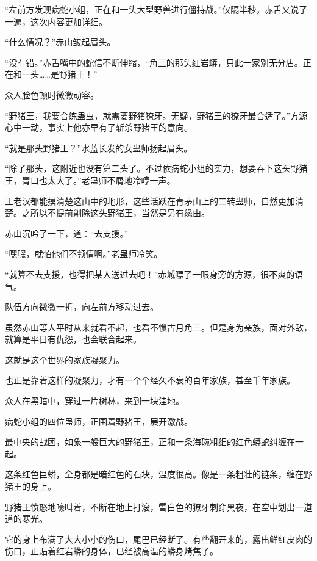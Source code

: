 
\begin{this_body}



“左前方发现病蛇小组，正在和一头大型野兽进行僵持战。”仅隔半秒，赤舌又说了一遍，这次内容更加详细。

“什么情况？”赤山皱起眉头。

“没有错。”赤舌嘴中的蛇信不断伸缩，“角三的那头红岩蟒，只此一家别无分店。正在和一头……是野猪王！”

众人脸色顿时微微动容。

“野猪王，我要合练蛊虫，就需要野猪獠牙。无疑，野猪王的獠牙最合适了。”方源心中一动，事实上他亦早有了斩杀野猪王的意向。

“就是那头野猪王？”水蓝长发的女蛊师扬起眉头。

“除了那头，这附近也没有第二头了。不过依病蛇小组的实力，想要吞下这头野猪王，胃口也太大了。”老蛊师不屑地冷哼一声。

王老汉都能摸清楚这山中的地形，这些活跃在青茅山上的二转蛊师，自然更加清楚。之所以不提前剿除这头野猪王，当然是另有缘由。

赤山沉吟了一下，道：“去支援。”

“嘿嘿，就怕他们不领情啊。”老蛊师冷笑。

“就算不去支援，也得把某人送过去吧！”赤城瞟了一眼身旁的方源，很不爽的语气。

队伍方向微微一折，向左前方移动过去。

虽然赤山等人平时从来就看不起，也看不惯古月角三。但是身为亲族，面对外敌，就算是平日有仇怨，也会联合起来。

这就是这个世界的家族凝聚力。

也正是靠着这样的凝聚力，才有一个个经久不衰的百年家族，甚至千年家族。

众人在黑暗中，穿过一片树林，来到一块洼地。

病蛇小组的四位蛊师，正围着野猪王，展开激战。

最中央的战团，如象一般巨大的野猪王，正和一条海碗粗细的红色蟒蛇纠缠在一起。

这条红色巨蟒，全身都是暗红色的石块，温度很高。像是一条粗壮的链条，缠在野猪王的身上。

野猪王愤怒地嚎叫着，不断在地上打滚，雪白色的獠牙刺穿黑夜，在空中划出一道道的寒光。

它的身上布满了大大小小的伤口，尾巴已经断了。有些翻开来的，露出鲜红皮肉的伤口，正贴着红岩蟒的身体，已经被高温的蟒身烤焦了。


\end{this_body}
